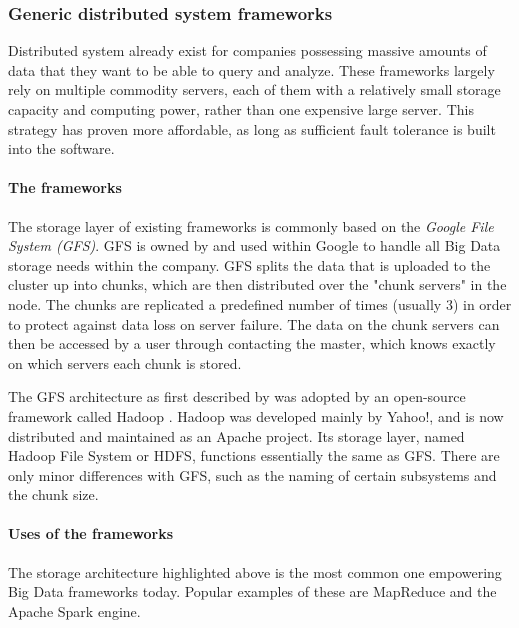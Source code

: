\subsubsection{Generic distributed system frameworks}
Distributed system already exist for companies possessing massive amounts of data that they want to be able to query and analyze. These frameworks largely rely on multiple commodity servers, each of them with a relatively small storage capacity and computing power, rather than one expensive large server. This strategy has proven more affordable, as long as sufficient fault tolerance is built into the software.

\paragraph{The frameworks}
The storage layer of existing frameworks is commonly based on the \textit{Google File System\cite{Ghem03} (GFS)}. GFS is owned by and used within Google to handle all Big Data storage needs within the company. GFS splits the data that is uploaded to the cluster up into chunks, which are then distributed over the "chunk servers" in the node. The chunks are replicated a predefined number of times (usually 3) in order to protect against data loss on server failure. The data on the chunk servers can then be accessed by a user through contacting the master, which knows exactly on which servers each chunk is stored.\cite{Ghem03} %

The GFS architecture as first described by \citep{Ghem03} was adopted by an open-source framework called Hadoop \cite{Shv10}. Hadoop was developed mainly by Yahoo!, and is now distributed and maintained as an Apache project. Its storage layer, named Hadoop File System or HDFS, functions essentially the same as GFS. There are only minor differences with GFS, such as the naming of certain subsystems and the chunk size. %

\paragraph{Uses of the frameworks}
The storage architecture highlighted above is the most common one empowering Big Data frameworks today. Popular examples of these are MapReduce and the Apache Spark engine.

